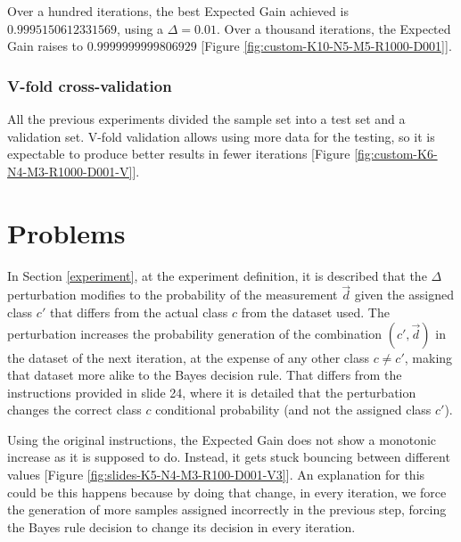 \documentclass[letterpaper, conference]{IEEEtran}
\begin{document}


Over a hundred iterations, the best Expected Gain achieved is $0.9995150612331569$, using a $\Delta = 0.01$. Over a thousand iterations, the Expected Gain raises to $0.9999999999806929$ [Figure \ref{fig:custom-K10-N5-M5-R1000-D001}].




\subsubsection{V-fold cross-validation}

All the previous experiments divided the sample set into a test set and a validation set. V-fold validation allows using more data for the testing, so it is expectable to produce better results in fewer iterations [Figure \ref{fig:custom-K6-N4-M3-R1000-D001-V}].



\section{Problems}\label{problems}

In Section \ref{experiment}, at the experiment definition, it is described that the $\Delta$ perturbation modifies to the probability of the measurement $\vec{d}$ given the assigned class $c'$ that differs from the actual class $c$ from the dataset used. The perturbation increases the probability generation of the combination $(c', \vec{d})$ in the dataset of the next iteration, at the expense of any other class $c \neq c'$, making that dataset more alike to the Bayes decision rule. That differs from the instructions provided in \cite{midterm-project} slide 24, where it is detailed that the perturbation changes the correct class $c$ conditional probability (and not the assigned class $c'$).

Using the original instructions, the Expected Gain does not show a monotonic increase as it is supposed to do. Instead, it gets stuck bouncing between different values [Figure \ref{fig:slides-K5-N4-M3-R100-D001-V3}]. An explanation for this could be this happens because by doing that change, in every iteration, we force the generation of more samples assigned incorrectly in the previous step, forcing the Bayes rule decision to change its decision in every iteration.


\end{document}
